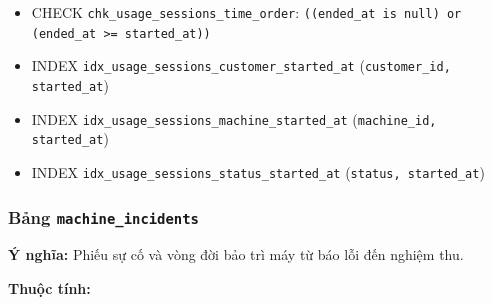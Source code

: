 \begin{itemize}
\item CHECK \texttt{chk\_usage\_sessions\_time\_order}: \texttt{((ended\_at is null) or (ended\_at >= started\_at))}

\item INDEX \texttt{idx\_usage\_sessions\_customer\_started\_at} (\texttt{customer\_id, started\_at})

\item INDEX \texttt{idx\_usage\_sessions\_machine\_started\_at} (\texttt{machine\_id, started\_at})

\item INDEX \texttt{idx\_usage\_sessions\_status\_started\_at} (\texttt{status, started\_at})

\end{itemize}

\subsubsection{Bảng \texttt{machine\_incidents}}

\textbf{Ý nghĩa:} Phiếu sự cố và vòng đời bảo trì máy từ báo lỗi đến nghiệm thu.\par

\textbf{Thuộc tính:}

